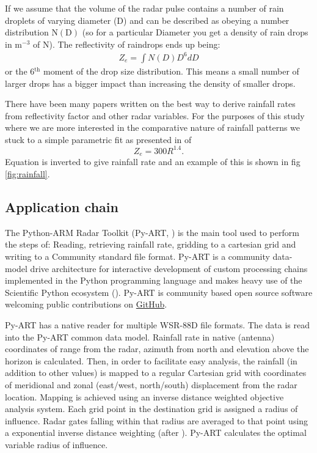 \documentclass[twocol]{ametsoc}
\begin{document}
If we assume that the volume of the radar pulse contains a number of rain droplets of varying diameter (D) and can be described 
as obeying a number distribution $\mathrm{N(D)}$ (so for a particular Diameter you get a density of rain drops in $\mathrm{m^{-3}}$ 
of N). The reflectivity of raindrops ends up being:
\begin{align*}
Z_e = \int{N(D)D^6dD}
\end{align*}
or the 6$\mathrm{^{th}}$ moment of the drop size distribution. This means a small number of larger drops has a bigger
 impact than increasing the density of smaller drops. 
 
 There have been many papers written on the best way to derive rainfall rates from reflectivity factor and other radar variables. 
 For the purposes of this study where we are more interested in the comparative nature of rainfall patterns we stuck to a simple 
 parametric fit as presented in \cite{gu_polarimetric_2011} of
\begin{equation}
\label{eq:zr}
 Z_e=300R^{1.4}.
 \end{equation}
Equation is inverted to give rainfall rate and an example of this is shown in fig \ref{fig:rainfall}.

\subsection{Application chain}
\label{sec:ac}
The Python-ARM Radar Toolkit (Py-ART, \cite{heistermann_emergence_2014})  is the main
tool used to perform the steps of: Reading, retrieving rainfall rate, gridding to a 
cartesian grid and writing to a Community standard file format. 
Py-ART is a community data-model drive architecture for interactive development
 of custom processing chains implemented in the Python programming 
language and makes heavy use of the Scientific Python ecosystem (\cite{scipy}). 
Py-ART is community based open source software welcoming
 public contributions on \href{https://github.com/ARM-DOE/pyart}{GitHub}.

Py-ART has a native reader for multiple WSR-88D file formats. The data is read 
into the Py-ART common data model. Rainfall rate in native (antenna) coordinates
of range from the radar, azimuth from north and elevation above the horizon is
 calculated. Then, in order to facilitate easy analysis, the rainfall (in addition to other values) 
is mapped to a regular Cartesian grid with coordinates of meridional and zonal 
(east/west, north/south) displacement from the radar location. Mapping is 
achieved using an inverse distance weighted objective analysis system. Each grid point in the
 destination grid is assigned a radius of influence. Radar gates falling within that radius are 
 averaged to that point using a exponential inverse distance weighting (after \cite{barnes_technique_1964}).
  Py-ART calculates the optimal variable radius of influence. 
\end{document}
